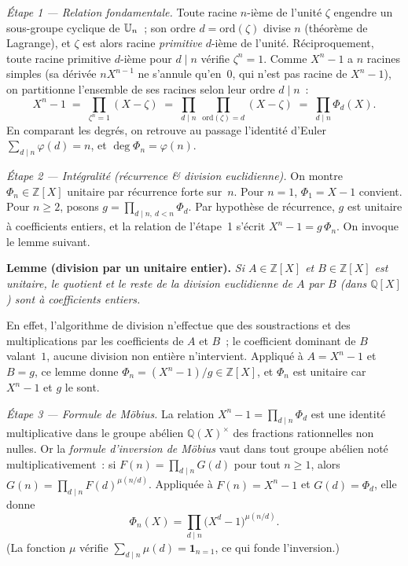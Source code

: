 \begin{mdframed}[style=proofbar]
  \textit{Étape 1 — Relation fondamentale.}
  Toute racine $n$-ième de l'unité $\zeta$ engendre un sous-groupe cyclique de
  $\mathbb{U}_n$~; son ordre $d=\mathrm{ord}(\zeta)$ divise $n$ (théorème de
  Lagrange), et $\zeta$ est alors racine \emph{primitive} $d$-ième de l'unité.
  Réciproquement, toute racine primitive $d$-ième pour $d\mid n$ vérifie
  $\zeta^n=1$. Comme $X^n-1$ a $n$ racines simples (sa dérivée $nX^{n-1}$ ne
  s'annule qu'en~$0$, qui n'est pas racine de $X^n-1$), on partitionne
  l'ensemble de ses racines selon leur ordre $d\mid n$~:
  \[
    X^n-1 \;=\; \prod_{\zeta^n=1}(X-\zeta)
            \;=\; \prod_{d\mid n}\ \prod_{\mathrm{ord}(\zeta)=d}(X-\zeta)
            \;=\; \prod_{d\mid n}\Phi_d(X).
  \]
  En comparant les degrés, on retrouve au passage l'identité d'Euler
  $\sum_{d\mid n}\varphi(d)=n$, et $\deg\Phi_n=\varphi(n)$.

  \medskip
  \textit{Étape 2 — Intégralité (récurrence \& division euclidienne).}
  On montre $\Phi_n\in\mathbb{Z}[X]$ unitaire par récurrence forte sur~$n$.
  Pour $n=1$, $\Phi_1=X-1$ convient. Pour $n\geq 2$, posons
  $g=\prod_{d\mid n,\ d<n}\Phi_d$. Par hypothèse de récurrence, $g$ est unitaire
  à coefficients entiers, et la relation de l'étape~1 s'écrit $X^n-1=g\,\Phi_n$.
  On invoque le lemme suivant.

  \smallskip\noindent
  \textbf{Lemme (division par un unitaire entier).}\enspace
  \textit{Si $A\in\mathbb{Z}[X]$ et $B\in\mathbb{Z}[X]$ est unitaire, le quotient
  et le reste de la division euclidienne de $A$ par $B$ (dans $\mathbb{Q}[X]$)
  sont à coefficients entiers.}

  \smallskip\noindent
  En effet, l'algorithme de division n'effectue que des soustractions et des
  multiplications par les coefficients de $A$ et $B$~; le coefficient dominant
  de $B$ valant~$1$, aucune division non entière n'intervient. Appliqué à
  $A=X^n-1$ et $B=g$, ce lemme donne $\Phi_n=(X^n-1)/g\in\mathbb{Z}[X]$, et
  $\Phi_n$ est unitaire car $X^n-1$ et $g$ le sont.

  \medskip
  \textit{Étape 3 — Formule de Möbius.}
  La relation $X^n-1=\prod_{d\mid n}\Phi_d$ est une identité multiplicative
  dans le groupe abélien $\mathbb{Q}(X)^\times$ des fractions rationnelles non
  nulles. Or la \emph{formule d'inversion de Möbius} vaut dans tout groupe
  abélien noté multiplicativement~: si $F(n)=\prod_{d\mid n}G(d)$ pour tout
  $n\geq 1$, alors $G(n)=\prod_{d\mid n}F(d)^{\mu(n/d)}$. Appliquée à
  $F(n)=X^n-1$ et $G(d)=\Phi_d$, elle donne
  \[
    \Phi_n(X)=\prod_{d\mid n}\bigl(X^d-1\bigr)^{\mu(n/d)}.
  \]
  (La fonction $\mu$ vérifie $\sum_{d\mid n}\mu(d)=\mathbf{1}_{n=1}$, ce qui
  fonde l'inversion.)


\end{mdframed}
